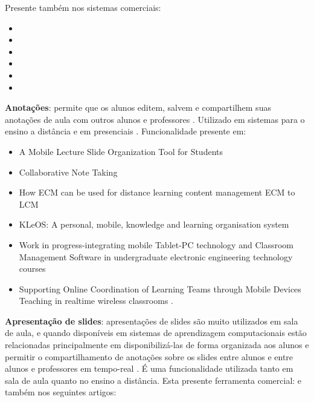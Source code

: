 \noindent
Presente também nos sistemas comerciais:

\vspace{-5mm}
\begin{itemize}
\item {}
\item {}
\item {}
\item {}
\item {}
\item {}
\end{itemize}




\textbf{Anotações}: permite que os alunos editem, salvem e compartilhem suas anotações de aula com outros alunos e professores \cite{singh_collaborative_2004, rawat_work_2008, griffioen_teaching_1998}. Utilizado em sistemas para o ensino a distância \cite{singh_collaborative_2004, rawat_work_2008} e em presenciais \cite{ griffioen_teaching_1998}. Funcionalidade presente em: 

\vspace{-5mm}
\begin{itemize}
\item A Mobile Lecture Slide Organization Tool for Students \cite{chow_mobile_2006}
\item Collaborative Note Taking \cite{singh_collaborative_2004}
\item How ECM can be used for distance learning content management ECM to LCM \cite{daoudi_how_2012}
\item KLeOS: A personal, mobile, knowledge and learning organisation system \cite{vavoula_kleos:_2002}
\item Work in progress-integrating mobile Tablet-PC technology and Classroom Management Software in undergraduate electronic engineering technology courses \cite{rawat_work_2008}
\item Supporting Online Coordination of Learning Teams through Mobile Devices \cite{roig-torres_supporting_2012}
Teaching in realtime wireless classrooms \cite{griffioen_teaching_1998}.
\end{itemize}

\textbf{Apresentação de slides}: apresentações de slides são muito utilizados em sala de aula, e quando disponíveis em sistemas de aprendizagem computacionais estão relacionadas principalmente em disponibilizá-las de forma organizada aos alunos \cite{chow_mobile_2006} e permitir o compartilhamento de anotações sobre os slides entre alunos e entre alunos e professores em tempo-real \cite{singh_collaborative_2004, griffioen_teaching_1998, rawat_work_2008}. É uma funcionalidade utilizada tanto em sala de aula quanto no ensino a distância. Esta presente ferramenta comercial:  e também nos seguintes artigos: 

